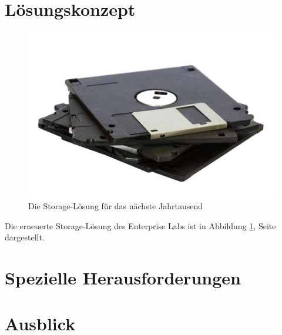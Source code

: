 \documentclass[a4paper,10pt,hidelinks]{scrartcl}
\newcommand{\imgref}[1]{{Abbildung \ref{#1}, Seite \pageref{#1}}}
\begin{document}
\blindtext

\section{\fontsize{14}{16}\selectfont Lösungskonzept}

\blindtext

\begin{figure}
    \centering
    \includegraphics[width=0.4\linewidth]{pics/storage-new.jpg}
    \caption{Die Storage-Lösung für das nächste Jahrtausend}
    \label{fig:storage-new}
\end{figure}

Die erneuerte Storage-Lösung des Enterprise Labs ist in \imgref{fig:storage-new} dargestellt.

\section{\fontsize{14}{16}\selectfont Spezielle Herausforderungen}

\blindtext

\section{\fontsize{14}{16}\selectfont Ausblick}

\blindtext
\end{document}
